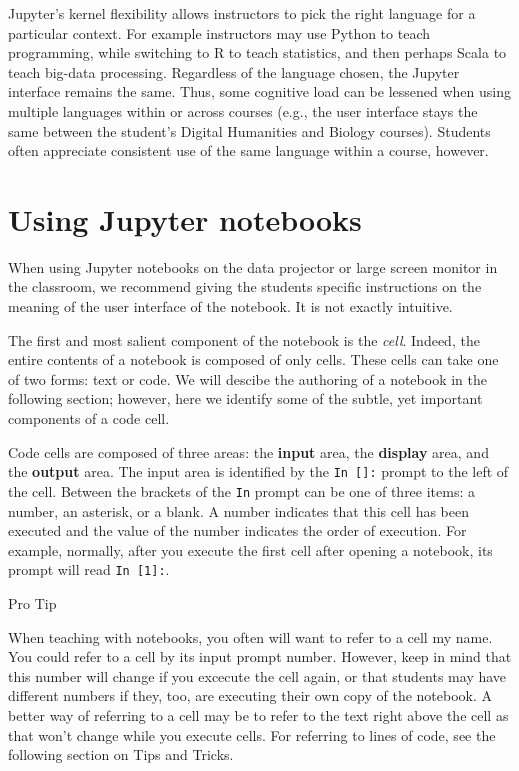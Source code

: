 \documentclass[]{book}
\let\BeginKnitrBlock\begin \let\EndKnitrBlock\end
\begin{document}
Jupyter's kernel flexibility allows instructors to pick the right
language for a particular context. For example instructors may use
Python to teach programming, while switching to R to teach statistics,
and then perhaps Scala to teach big-data processing. Regardless of the
language chosen, the Jupyter interface remains the same. Thus, some
cognitive load can be lessened when using multiple languages within or
across courses (e.g., the user interface stays the same between the
student's Digital Humanities and Biology courses). Students often
appreciate consistent use of the same language within a course, however.

\section{Using Jupyter notebooks}\label{using-jupyter-notebooks}

When using Jupyter notebooks on the data projector or large screen
monitor in the classroom, we recommend giving the students specific
instructions on the meaning of the user interface of the notebook. It is
not exactly intuitive.

The first and most salient component of the notebook is the \emph{cell}.
Indeed, the entire contents of a notebook is composed of only cells.
These cells can take one of two forms: text or code. We will descibe the
authoring of a notebook in the following section; however, here we
identify some of the subtle, yet important components of a code cell.

Code cells are composed of three areas: the \textbf{input} area, the
\textbf{display} area, and the \textbf{output} area. The input area is
identified by the \texttt{In\ {[}{]}:} prompt to the left of the cell.
Between the brackets of the \texttt{In} prompt can be one of three
items: a number, an asterisk, or a blank. A number indicates that this
cell has been executed and the value of the number indicates the order
of execution. For example, normally, after you execute the first cell
after opening a notebook, its prompt will read \texttt{In\ {[}1{]}:}.

\BeginKnitrBlock{rmdnote}
Pro Tip

When teaching with notebooks, you often will want to refer to a cell my
name. You could refer to a cell by its input prompt number. However,
keep in mind that this number will change if you excecute the cell
again, or that students may have different numbers if they, too, are
executing their own copy of the notebook. A better way of referring to a
cell may be to refer to the text right above the cell as that won't
change while you execute cells. For referring to lines of code, see the
following section on Tips and Tricks.
\EndKnitrBlock{rmdnote}
\end{document}
